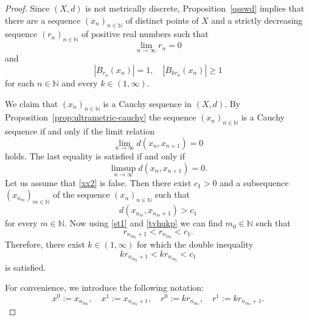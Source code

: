 \documentclass[10pt,a4paper]{amsart}
\begin{document}
\begin{proof}
Since $(X,d)$ is not metrically discrete, Proposition~\ref{qsswd} implies that there are a sequence $(x_n)_{n\in\mathbb{N}}$ of distinct points of $X$ 
    and a strictly decreasing sequence $(r_n)_{n\in\mathbb{N}}$ of  positive real numbers 
    such that 
    \begin{equation}\label{st1}
    \lim\limits_{n\to\infty}r_n=0
        \end{equation}
    and
\begin{equation}
    \label{st2}
\left|B_{r_n}(x_n)\right|=1,\quad \left|B_{kr_n}(x_n)\right|\geq 1
    \end{equation}
    for each $n\in {\mathbb N}$ and every $k\in (1,\infty).$



We claim that $(x_n)_{n\in\mathbb{N}}$ is a Cauchy sequence in $(X,d)$.  
By Proposition~\ref{prop:ultrametric-cauchy} the sequence $(x_n)_{n\in\mathbb{N}}$ is a Cauchy sequence if and only if the limit relation
\begin{equation*}
\lim_{n\to\infty} d(x_n,x_{n+1})=0
\end{equation*}
holds.
The last equality is satisfied if and only if
\begin{equation}\label{xx2}
    \limsup_{n\to\infty} d(x_n, x_{n+1}) = 0.
\end{equation}
Let us assume that \eqref{xx2} is false.  
Then there exist $c_1>0$ and a subsequence $(x_{n_m})_{m\in\mathbb{N}}$ of the sequence $(x_n)_{n\in\mathbb{N}}$ such that
\begin{equation}
    \label{tvhukp}
      d(x_{n_m}, x_{n_m+1}) > c_1
\end{equation}
for every $m\in \mathbb N$.
Now using \eqref{st1} and \eqref{tvhukp} we can find $m_0\in \mathbb N$ such that 
\begin{equation}\label{cc1}
    r_{n_{m_0}+1}< r_{n_{m_0}}<c_1.
\end{equation}
Therefore, there exist $k\in (1,\infty)$ for which the double inequality
\begin{equation}
    \label{cc2}
kr_{n_{m_0}+1}<kr_{n_{m_0}}<c_1
\end{equation}
is satisfied.

For convenience, we introduce the following notation:
\begin{equation}
    \label{cc3}
    x^0 := x_{n_{m_0}}, \quad x^1 := x_{n_{m_0}+1}, \quad
    r^0 := kr_{n_{m_0}}, \quad r^1 := kr_{n_{m_0}+1}.
\end{equation}


\end{proof}
\end{document}
